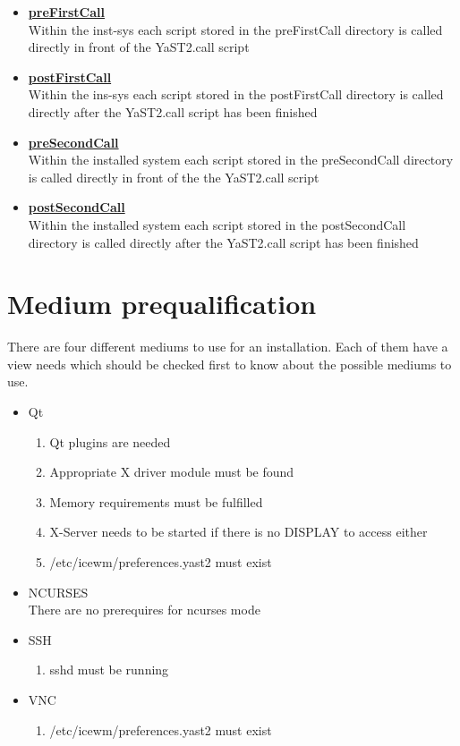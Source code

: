 \begin{itemize}
\item \textbf{\underline{preFirstCall}}\\
	Within the inst-sys each script stored in the preFirstCall directory is
	called directly in front of the YaST2.call script
\item \textbf{\underline{postFirstCall}}\\
	Within the ins-sys each script stored in the postFirstCall directory is
	called directly after the YaST2.call script has been finished
\item \textbf{\underline{preSecondCall}}\\
	Within the installed system each script stored in the preSecondCall
	directory is called directly in front of the the YaST2.call script
\item \textbf{\underline{postSecondCall}}\\
	Within the installed system each script stored in the postSecondCall
	directory is called directly after the YaST2.call script has been
	finished
\end{itemize}

\section{Medium prequalification}
There are four different mediums to use for an installation. Each
of them have a view needs which should be checked first to know
about the possible mediums to use.

\begin{itemize}
\item Qt
	\begin{enumerate}
	\item Qt plugins are needed
	\item Appropriate X driver module must be found
	\item Memory requirements must be fulfilled
	\item X-Server needs to be started if there is no DISPLAY to access either
	\item /etc/icewm/preferences.yast2 must exist
	\end{enumerate}
\item NCURSES\\
	There are no prerequires for ncurses mode
\item SSH
	\begin{enumerate}
	\item sshd must be running
	\end{enumerate}
\item VNC
	\begin{enumerate}
	\item /etc/icewm/preferences.yast2 must exist
	\end{enumerate}
\end{itemize}


